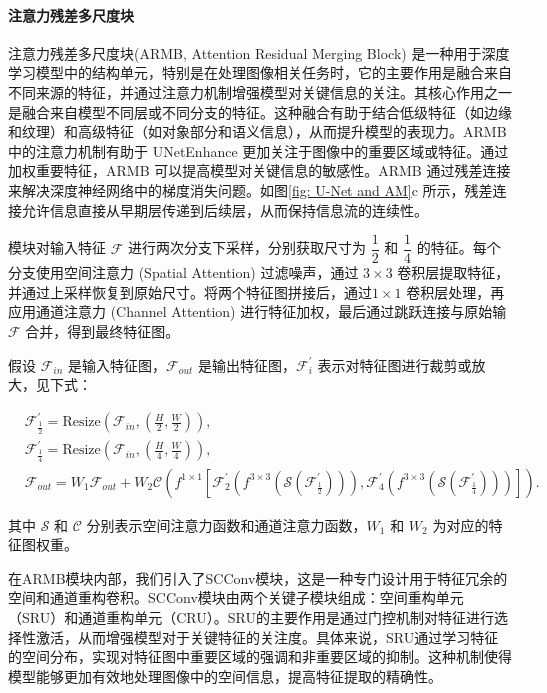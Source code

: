 \documentclass[a4paper]{ctexart}
\begin{document}
	\paragraph{注意力残差多尺度块}
	
	注意力残差多尺度块(ARMB, Attention Residual Merging Block) 是一种用于深度学习模型中的结构单元，特别是在处理图像相关任务时，它的主要作用是融合来自不同来源的特征，并通过注意力机制增强模型对关键信息的关注。其核心作用之一是融合来自模型不同层或不同分支的特征。这种融合有助于结合低级特征（如边缘和纹理）和高级特征（如对象部分和语义信息），从而提升模型的表现力。ARMB 中的注意力机制有助于 UNetEnhance 更加关注于图像中的重要区域或特征。通过加权重要特征，ARMB 可以提高模型对关键信息的敏感性。ARMB 通过残差连接来解决深度神经网络中的梯度消失问题。如图\ref{fig: U-Net and AM}c 所示，残差连接允许信息直接从早期层传递到后续层，从而保持信息流的连续性。
	
	模块对输入特征 $\mathcal{F}$ 进行两次分支下采样，分别获取尺寸为 $\dfrac{1}{2}$ 和 $\dfrac{1}{4}$ 的特征。每个分支使用空间注意力 (Spatial Attention) 过滤噪声，通过 $3 \times 3$ 卷积层提取特征，并通过上采样恢复到原始尺寸。将两个特征图拼接后，通过$ 1 \times 1$ 卷积层处理，再应用通道注意力 (Channel Attention) 进行特征加权，最后通过跳跃连接与原始输 $\mathcal{F}$ 合并，得到最终特征图。
	
	假设 $\mathcal{F}_{in}$ 是输入特征图，$\mathcal{F}_{out}$ 是输出特征图，$\mathcal{F}_{i}^\prime$ 表示对特征图进行裁剪或放大，见下式：
	
	\begin{equation}
		\begin{aligned}
			&\mathcal{F}^\prime_{\frac{1}{2}} = \text{Resize}\left(\mathcal{F}_{in},\left(\frac{H}{2},\frac{W}{2}\right)\right), \\
			&\mathcal{F}^\prime_{\frac{1}{4}} = \text{Resize}\left(\mathcal{F}_{in},\left(\frac{H}{4},\frac{W}{4}\right)\right), \\
			&\mathcal{F}_{out} = W_1\mathcal{F}_{out} + W_2\mathcal{C} \left( f^{1 \times 1}  \left[\mathcal{F}^\prime_2 (f^{3 \times 3}(\mathcal{S}(\mathcal{F}^\prime_{\frac{1}{2}}))), \mathcal{F}^\prime_4 (f^{3 \times 3}(\mathcal{S}(\mathcal{F}^\prime_{\frac{1}{4}})))\right] \right).
		\end{aligned}
		\label{eq: ARMB}
	\end{equation}
	
	其中 $\mathcal{S}$ 和 $\mathcal{C}$ 分别表示空间注意力函数和通道注意力函数，$W_1$ 和 $W_2$ 为对应的特征图权重。
	
	在ARMB模块内部，我们引入了SCConv模块，这是一种专门设计用于特征冗余的空间和通道重构卷积。SCConv模块由两个关键子模块组成：空间重构单元（SRU）和通道重构单元（CRU）。SRU的主要作用是通过门控机制对特征进行选择性激活，从而增强模型对于关键特征的关注度。具体来说，SRU通过学习特征的空间分布，实现对特征图中重要区域的强调和非重要区域的抑制。这种机制使得模型能够更加有效地处理图像中的空间信息，提高特征提取的精确性。
	
\end{document}
